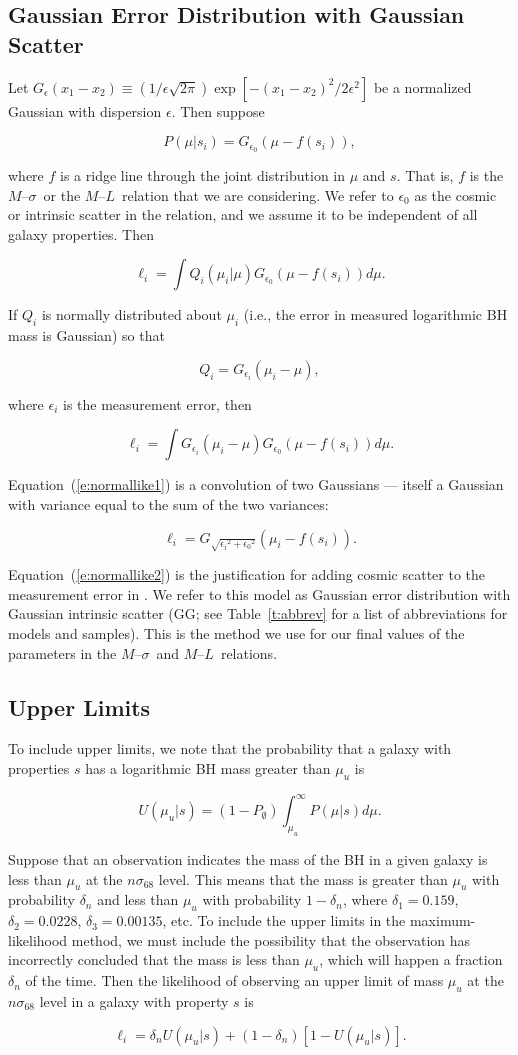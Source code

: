 \documentclass[twosided,letterpaper,numberedappendix]{emulateapj}
\newcommand{\beq}{
\begin{equation}
}
\newcommand{\eeq}{
\end{equation}
}
\newcommand{\msigma}   {\ensuremath{M}{--}\ensuremath{\sigma}}
\newcommand{\ml}       {\ensuremath{M}{--}\ensuremath{L}}
\newcommand{\sigmaconf}   {\ensuremath{\sigma_{68}}}
\begin{document}
\subsection{Gaussian Error Distribution with Gaussian Scatter}
\label{xg}
Let $G_{\epsilon}(x_1 - x_2) \equiv (1/\epsilon\sqrt{2\pi})\exp{[-(x_1 -
x_2)^2/2\epsilon^2]}$ be a normalized Gaussian with dispersion
$\epsilon$.  Then suppose
%
\beq
P\left(\mu | s_{i}\right) = G_{\epsilon_0}\left(\mu - f(s_i)\right),
\label{e:normscat}
\eeq
%
where $f$ is a ridge line through the joint distribution in $\mu$ and
$s$.  That is, $f$ is the \msigma\ or the \ml\ relation that we are
considering.  We refer to $\epsilon_0$ as the cosmic or intrinsic scatter
in the relation, and we assume it to be independent of all galaxy
properties.  Then
%
\beq
\ell_{i} = \int Q_i\left(\mu_i | \mu\right) G_{\epsilon_0}\left(\mu 
- f(s_i)\right) d\mu.
\eeq
%
If $Q_i$ is normally distributed about $\mu_i$ (i.e., the error in
measured logarithmic BH mass is Gaussian) so that
%
\beq
Q_i =  G_{\epsilon_i}\left(\mu_i - \mu\right),
\eeq
%
where $\epsilon_i$ is the measurement error, then
%
\beq
\ell_i = \int G_{\epsilon_i}\left(\mu_i - \mu\right) G_{\epsilon_0} 
\left(\mu - f(s_i)\right) d\mu.
\label{e:normallike1}
\eeq 
%
Equation~(\ref{e:normallike1}) is a convolution of two Gaussians ---
itself a Gaussian with variance equal to the sum of the two variances:
%
\beq
\ell_i = G_{\sqrt{{\epsilon_i}^2 + {\epsilon_0}^2}}\left(\mu_i - 
f(s_i)\right).
\label{e:normallike2}
\eeq
%
Equation~(\ref{e:normallike2}) is the justification for adding cosmic
scatter to the measurement error in \citet{tremaineetal02}.  We refer
to this model as Gaussian error distribution with Gaussian intrinsic
scatter (GG; see Table~\ref{t:abbrev} for a list of abbreviations for
models and samples).  This is the method we use for our final values
of the parameters in the \msigma\ and \ml\ relations.


\subsection{Upper Limits}
\label{uls}
To include upper limits, we note that the probability that a galaxy
with properties $s$ has a logarithmic BH mass greater than
$\mu_u$ is
%
\beq
U(\mu_u | s) = (1 - P_\emptyset)\int_{\mu_u}^{\infty} P(\mu | s) d\mu.
\eeq
%
Suppose that an observation indicates the mass of the BH in a
given galaxy is less than $\mu_u$ at the $n\sigmaconf$ level.  This
means that the mass is greater than $\mu_u$ with probability
$\delta_n$ and less than $\mu_u$ with probability $1 - \delta_n$,
where $\delta_1 = 0.159$, $\delta_2 = 0.0228$, $\delta_3 = 0.00135$,
etc.  To include the upper limits in the maximum-likelihood method, we
must include the possibility that the observation has incorrectly
concluded that the mass is less than $\mu_u$, which will happen a
fraction $\delta_n$ of the time.  Then the likelihood of observing
an upper limit of mass $\mu_u$ at the $n\sigmaconf$ level in a galaxy
with property $s$ is
%
\beq
\ell_i = \delta_n U(\mu_u | s) + (1 - \delta_n) [1 - U(\mu_u | s)].
\eeq
%
\end{document}
